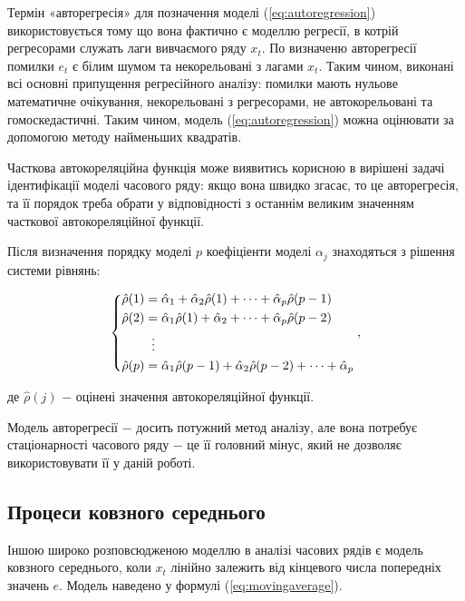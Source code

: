Термін «авторегресія» для позначення моделі (\ref{eq:autoregression}) використовується тому що вона фактично є моделлю регресії, в котрій регресорами служать лаги вивчаємого ряду $x_{t}$. По визначеню авторегресії помилки $e_{t}$ є білим шумом та некорельовані з лагами $x_{t}$. Таким чином, виконані всі основні припущення регресійного аналізу: помилки мають нульове математичне очікування, некорельовані з регресорами, не автокорельовані та гомоскедастичні. Таким чином, модель (\ref{eq:autoregression}) можна оцінювати за допомогою методу найменьших квадратів.

Часткова автокореляційна функція може виявитись корисною в вирішені задачі ідентифікації моделі часового ряду: якщо вона швидко згасає, то це авторегресія, та її порядок треба обрати у відповідності з останнім великим значенням часткової автокореляційної функції.

Після визначення порядку моделі $p$ коефіціенти моделі $\alpha_{j}$ знаходяться з рішення системи рівнянь:

\begin{equation}
	\left\{
	\begin{aligned}
	\hat{\rho}(1) &= \hat{\alpha}_{1} + \hat{\alpha}_{2}\hat{\rho}(1) + \dots + \hat{\alpha}_{p}\hat{\rho}(p-1) \\
	\hat{\rho}(2) &= \hat{\alpha}_{1}\hat{\rho}(1) + \hat{\alpha}_{2} + \dots + \hat{\alpha}_{p}\hat{\rho}(p-2) \\
	&\;\;\vdots \notag \\
	\hat{\rho}(p) &= \hat{\alpha}_{1}\hat{\rho}(p-1) + \hat{\alpha}_{2}\hat{\rho}(p-2) + \dots + \hat{\alpha}_{p} \\
	\end{aligned}
	\right.,
\end{equation}

\noindent де $\hat{\rho}(j)$ $-$ оцінені значення автокореляційної функції.

\vspace{1.5em}

Модель авторегресії $-$ досить потужний метод аналізу, але вона потребує стаціонарності часового ряду $-$ це її головний мінус, який не дозволяє використовувати її у даній роботі.

\subsection{Процеси ковзного середнього}

Іншою широко розповсюдженою моделлю в аналізі часових рядів є модель ковзного середнього, коли $x_{t}$ лінійно залежить від кінцевого числа попередніх значень $e$. Модель наведено у формулі (\ref{eq:movingaverage}).

